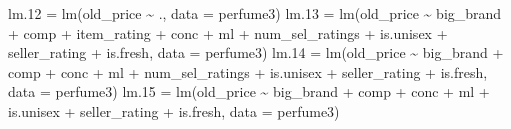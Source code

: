 \documentclass[
]{article}
\newenvironment{Shaded}{\begin{snugshade}}{\end{snugshade}}
\newcommand{\AttributeTok}[1]{\textcolor[rgb]{0.77,0.63,0.00}{#1}}
\newcommand{\FloatTok}[1]{\textcolor[rgb]{0.00,0.00,0.81}{#1}}
\newcommand{\FunctionTok}[1]{\textcolor[rgb]{0.00,0.00,0.00}{#1}}
\newcommand{\NormalTok}[1]{#1}
\newcommand{\OtherTok}[1]{\textcolor[rgb]{0.56,0.35,0.01}{#1}}
\newcommand{\SpecialCharTok}[1]{\textcolor[rgb]{0.00,0.00,0.00}{#1}}
\begin{document}
\begin{Shaded}
\begin{Highlighting}[]
\NormalTok{lm}\FloatTok{.12} \OtherTok{=} \FunctionTok{lm}\NormalTok{(old\_price }\SpecialCharTok{\textasciitilde{}}\NormalTok{ ., }\AttributeTok{data =}\NormalTok{ perfume3)}
\NormalTok{lm}\FloatTok{.13} \OtherTok{=} \FunctionTok{lm}\NormalTok{(old\_price }\SpecialCharTok{\textasciitilde{}}\NormalTok{ big\_brand }\SpecialCharTok{+}\NormalTok{ comp }\SpecialCharTok{+}\NormalTok{ item\_rating }\SpecialCharTok{+}
\NormalTok{            conc }\SpecialCharTok{+}\NormalTok{ ml }\SpecialCharTok{+}\NormalTok{ num\_sel\_ratings }\SpecialCharTok{+}
\NormalTok{            is.unisex }\SpecialCharTok{+}\NormalTok{ seller\_rating }\SpecialCharTok{+}\NormalTok{ is.fresh, }\AttributeTok{data =}\NormalTok{ perfume3)}
\NormalTok{lm}\FloatTok{.14} \OtherTok{=} \FunctionTok{lm}\NormalTok{(old\_price }\SpecialCharTok{\textasciitilde{}}\NormalTok{ big\_brand }\SpecialCharTok{+}\NormalTok{ comp }\SpecialCharTok{+} 
\NormalTok{            conc }\SpecialCharTok{+}\NormalTok{ ml }\SpecialCharTok{+}\NormalTok{ num\_sel\_ratings }\SpecialCharTok{+}
\NormalTok{            is.unisex }\SpecialCharTok{+}\NormalTok{ seller\_rating }\SpecialCharTok{+}\NormalTok{ is.fresh, }\AttributeTok{data =}\NormalTok{ perfume3)}
\NormalTok{lm}\FloatTok{.15} \OtherTok{=} \FunctionTok{lm}\NormalTok{(old\_price }\SpecialCharTok{\textasciitilde{}}\NormalTok{ big\_brand }\SpecialCharTok{+}\NormalTok{ comp }\SpecialCharTok{+} 
\NormalTok{            conc }\SpecialCharTok{+}\NormalTok{ ml }\SpecialCharTok{+}\NormalTok{ is.unisex }\SpecialCharTok{+}\NormalTok{ seller\_rating }\SpecialCharTok{+}\NormalTok{ is.fresh, }\AttributeTok{data =}\NormalTok{ perfume3)}


\end{Highlighting}
\end{Shaded}
\end{document}
